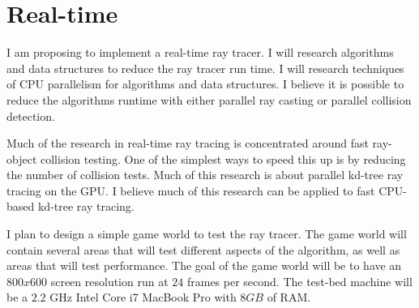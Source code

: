 \section{Real-time}
I am proposing to implement a real-time ray tracer.  I will research algorithms and data structures to reduce the ray tracer run time.  I will research techniques of CPU parallelism for algorithms and data structures.  I believe it is possible to reduce the algorithms runtime with either parallel ray casting or parallel collision detection.

Much of the research in real-time ray tracing is concentrated around fast ray-object collision testing.  One of the simplest ways to speed this up is by reducing the number of collision tests\cite{kd:2005}.
Much of this research is about parallel kd-tree ray tracing on the GPU\cite{kd:2007}\cite{fkd:2007}.  I believe much of this research can be applied to fast CPU-based kd-tree ray tracing\cite{kd:2006}.

I plan to design a simple game world to test the ray tracer.  The game world will contain several areas that will test different aspects of the algorithm, as well as areas that will test performance.  The goal of the game world will be to have an $800x600$ screen resolution run at $24$ frames per second.  The test-bed machine will be a $2.2$ GHz Intel Core i7 MacBook Pro with $8GB$ of RAM.  


